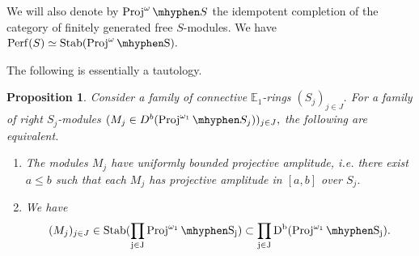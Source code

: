 \documentclass[11pt,leqno]{amsart}
\newtheorem{prop}[theo]{Proposition}
\numberwithin{equation}{section}
\newcommand{\tens}[1]{%
  \mathbin{\mathop{\otimes}\displaylimits_{#1}}%
}
\newcommand{\hy}{\mhyphen}
\newcommand{\prodd}[1][]{\mathop{\prod}\limits_{#1}}
\newcommand{\Proj}{\operatorname{Proj}}
\newcommand{\Flat}{\operatorname{Flat}}
\newcommand{\bE}{{\mathbb E}}
\newcommand{\Perf}{\operatorname{Perf}}
\newcommand{\Tor}{\operatorname{Tor}}
\newcommand{\Sp}{\operatorname{Sp}}
\newcommand{\Ind}{\operatorname{Ind}}
\newcommand{\Stab}{\rm Stab}
\begin{document}
We will also denote by $\Proj^{\omega}\hy S$ the idempotent completion of the category of finitely generated free $S$-modules. We have $\Perf(S)\simeq\Stab(\Proj^{\omega}\hy S).$



The following is essentially a tautology.

\begin{prop}\label{prop:uniformly_bounded_amplitude}
Consider a family of connective $\bE_1$-rings $(S_j)_{j\in J}.$ For a family of right $S_j$-modules $(M_j\in D^b(\Proj^{\omega_1}\hy S_j))_{j\in J},$ the following are equivalent.
\begin{enumerate}[label=(\roman*),ref=(\roman*)]
\item The modules $M_j$ have uniformly bounded projective amplitude, i.e. there exist $a\leq b$ such that each $M_j$ has projective amplitude in $[a,b]$ over $S_j.$ \label{uniformly_bounded_proj_amplitude}
\item We have
\begin{equation*}
(M_j)_{j\in J}\in \Stab(\prodd[j\in J]\Proj^{\omega_1}\hy S_j)\subset \prodd[j\in J]D^b(\Proj^{\omega_1}\hy S_j).
\end{equation*} 
\end{enumerate}
\end{prop}
\end{document}
